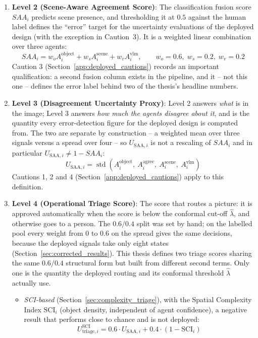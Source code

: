 \documentclass[12pt,a4paper]{report}
\begin{document}
\begin{enumerate}
    \item \textbf{Level 2 (Scene-Aware Agreement Score)}: The classification fusion score $SAA_i$ predicts scene presence, and thresholding it at $0.5$ against the human label defines the ``error'' target for the uncertainty evaluations of the deployed design (with the exception in Caution~3). It is a weighted linear combination over three agents:
    \begin{equation}
        SAA_i = w_o A_i^{\text{object}} + w_s A_i^{\text{scene}} + w_v A_i^{\text{vlm}},
        \qquad w_o = 0.6,\; w_s = 0.2,\; w_v = 0.2
    \end{equation}
    Caution 3 (Section~\ref{app:deployed_cautions}) records an important qualification: a second fusion column exists in the pipeline, and it -- not this one -- defines the error label behind two of the thesis's headline numbers.

    \item \textbf{Level 3 (Disagreement Uncertainty Proxy)}: Level 2 answers \emph{what} is in the image; Level 3 answers \emph{how much the agents disagree about it}, and is the quantity every error-detection figure for the deployed design is computed from. The two are separate by construction -- a weighted mean over three signals versus a spread over four -- so $U_{\text{SAA},i}$ is not a rescaling of $SAA_i$ and in particular $U_{\text{SAA},i} \ne 1 - SAA_i$:
    \begin{equation}
        U_{\text{SAA}, i} = \operatorname{std}\left(A_i^{\text{object}},\ A_i^{\text{agree}},\ A_i^{\text{scene}},\ A_i^{\text{vlm}}\right)
    \end{equation}
    Cautions 1, 2 and 4 (Section~\ref{app:deployed_cautions}) apply to this definition.

    \item \textbf{Level 4 (Operational Triage Score)}: The score that routes a picture: it is approved automatically when the score is below the conformal cut-off $\hat\lambda$, and otherwise goes to a person. The $0.6/0.4$ split was set by hand; on the labelled pool every weight from $0$ to $0.6$ on the spread gives the same decisions, because the deployed signals take only eight states (Section~\ref{sec:corrected_results}). This thesis defines two triage scores sharing the same $0.6/0.4$ structural form but built from different second terms. Only one is the quantity the deployed routing and its conformal threshold $\hat\lambda$ actually use.
    \begin{itemize}
        \item \emph{SCI-based} (Section~\ref{sec:complexity_triage}), with the Spatial Complexity Index $\text{SCI}_i$ (object density, independent of agent confidence), a negative result that performs close to chance and is not deployed:
        \begin{equation}
            U_{\text{triage}, i}^{\text{SCI}} = 0.6 \cdot U_{\text{SAA}, i} + 0.4 \cdot (1 - \text{SCI}_i)
        \end{equation}
        

\end{itemize}
\end{enumerate}
\end{document}
